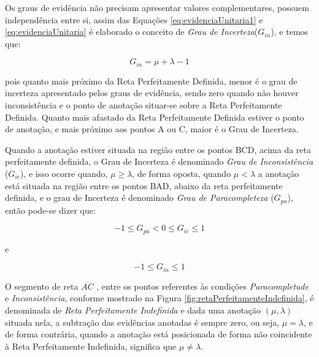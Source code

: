 Os graus de evidência não precisam apresentar valores complementares, possuem independência entre si, assim das Equações  
\ref{eq:evidenciaUnitaria1} e 
\ref{eq:evidenciaUnitaria} 
é elaborado o conceito de 
\emph{Grau de Incerteza}($G_{in}$), 
e temos que: 


\begin{center}
\begin{equation}
G_{in} = \mu + \lambda - 1
\label{eq:grauContradicao}
\end{equation}
\end{center}

pois quanto mais próximo da Reta Perfeitamente Definida, menor é o grau de incerteza apresentado pelos graus de evidência, sendo zero quando não houver inconsistência e o ponto de anotação situar-se sobre a Reta Perfeitamente Definida. 
Quanto mais afastado da Reta Perfeitamente Definida estiver o ponto de anotação, e mais próximo aos pontos A ou C, maior é o Grau de Incerteza. 

Quando a anotação estiver situada na região entre os pontos BCD, acima da reta perfeitamente definida, o Grau de Incerteza é denominado 
\emph{Grau de Inconsistência} ($G_{ic}$), 
e isso ocorre quando, $\mu \ge \lambda $, de forma oposta, quando $\mu < \lambda $ a anotação está situada na região entre os pontos BAD, abaixo da reta perfeitamente definida, e o grau de Incerteza é denominado 
\emph{Grau de Paracompleteza} ($G_{pa}$), 
então pode-se dizer que:


\begin{center}
\begin{equation}
-1 \le G _{pa}  <  0 \le G _{ic} \le 1
\label{eq:grauInconsistenciaIndefinicao}
\end{equation}
\end{center}
e
\begin{center}
\begin{equation}
-1 \le G _{in} \le 1
\label{eq:grauInconsistenciaIndefinicao1}
\end{equation}
\end{center}


O segmento de reta $\overline{ AC }$ , entre os pontos referentes às
condições \emph{Paracompletude} e \emph{Inconsistência}, conforme mostrado
na Figura \ref{fig:retaPerfeitamenteIndefinida}, é denominada de
\emph{Reta Perfeitamente Indefinida} e dada uma anotação $(\mu,
\lambda )$ situada nela, a subtração das evidências anotadas é sempre
zero, ou seja, $\mu = \lambda$, e de forma contrária,
quando a anotação está posicionada de forma não coincidente à Reta
Perfeitamente Indefinida,
significa que $\mu \neq \lambda$.

